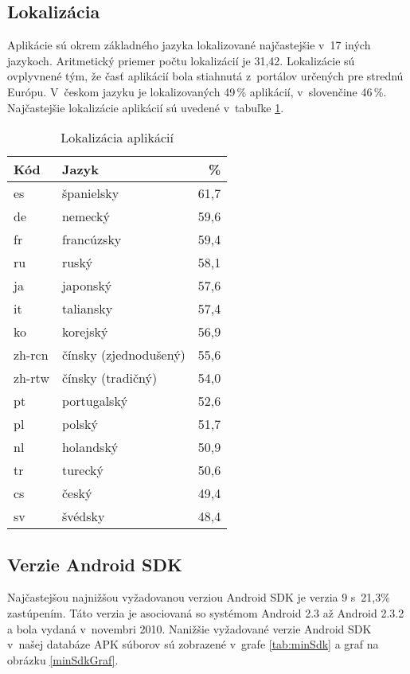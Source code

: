 \subsection{Lokalizácia}
Aplikácie sú okrem základného jazyka lokalizované najčastejšie v~17 iných jazykoch. Aritmetický priemer počtu lokalizácií je 31,42. Lokalizácie sú ovplyvnené tým, že časť aplikácií bola stiahnutá z~portálov určených pre strednú Európu. V~českom jazyku je lokalizovaných 49\,\% aplikácií, v~slovenčine 46\,\%. Najčastejšie lokalizácie aplikácií sú uvedené v~tabuľke \ref{tab:language}.
\begin{table}[htb]
\centering
  \begin{tabular}{|l l r|}
    \hline
    \textbf{Kód} & \textbf{Jazyk} &  \textbf{\%} \\\hline\hline
    es & španielsky & 61,7 \\
    de & nemecký & 59,6 \\
    fr & francúzsky & 59,4 \\
    ru & ruský & 58,1 \\
    ja & japonský & 57,6 \\
    it & taliansky & 57,4 \\
	ko & korejský & 56,9 \\
	zh-rcn & čínsky (zjednodušený) & 55,6\\
	zh-rtw & čínsky (tradičný)& 54,0\\
	pt & portugalský & 52,6\\
	pl & polský & 51,7\\
	nl & holandský & 50,9\\
	tr & turecký & 50,6\\
	cs & český & 49,4\\
	sv & švédsky & 48,4\\
    \hline
  \end{tabular}
  \caption{Lokalizácia aplikácií}
  \label{tab:language}
\end{table}

\subsection{Verzie Android SDK}

Najčastejšou najnižšou vyžadovanou verziou Android SDK je verzia 9 s~21,3\% zastúpením. Táto verzia je asociovaná so systémom Android 2.3 až Android 2.3.2  a bola vydaná v~novembri 2010. Nanižšie vyžadované verzie Android SDK v~našej databáze APK súborov sú zobrazené v~grafe \ref{tab:minSdk}  a graf na obrázku \ref{minSdkGraf}.


